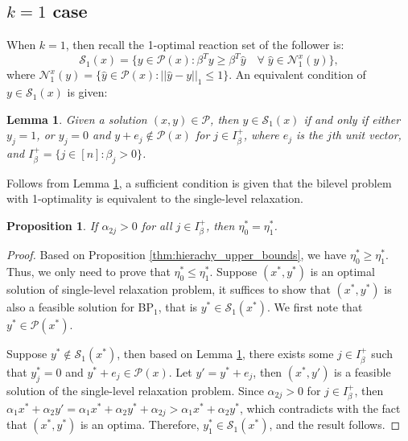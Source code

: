 \documentclass[11pt]{article}
\newtheorem{lemma}{Lemma}
\newtheorem{proposition}{Proposition}
\newcommand{\N}{\mathcal{N}}
\newcommand{\Pp}{\mathcal{P}}
\newcommand{\Ss}{\mathcal{S}}
\begin{document}
\subsection{$k = 1$ case}

When $k=1$, then recall the 1-optimal reaction set of the follower is:
\[\Ss_1(x) = \{y \in \Pp(x): \beta^T y \geq \beta^T \hat{y} \quad \forall\; \hat{y} \in \N^x_1(y)\},\]
where $\N^x_1(y) = \{\hat{y} \in \Pp(x): ||\hat{y} - y||_1 \leq 1 \}$. An equivalent condition of $y\in \Ss_1(x)$ is given:
\begin{lemma}\label{thm:opt_condition_k1}
	Given a solution $(x, y) \in \Pp$, then $y\in \Ss_1(x)$ if and only if either $y_j = 1$, or $y_j = 0$ and $y + e_j \notin \Pp(x)$ for $j\in I_\beta^+$,  where $e_j$ is the $j$th unit vector, and $I_\beta^+ = \{j \in [n]: \beta_j >0\}$.
\end{lemma}

Follows from Lemma \ref{thm:opt_condition_k1}, a sufficient condition is given that the bilevel problem with 1-optimality is equivalent to the single-level relaxation.

\begin{proposition} \label{thm:hpp=1optimal}
	If $\alpha_{2j} > 0$ for all $j\in I_\beta^+$, then $\eta_0^* = \eta_1^*$.
\end{proposition}
\begin{proof}
	Based on Proposition \ref{thm:hierachy_upper_bounds}, we have $\eta^*_0 \geq \eta^*_1$. Thus, we only need to prove that $\eta^*_0 \leq \eta^*_1$. Suppose $(x^*, y^*)$ is an optimal solution of single-level relaxation problem, it suffices to show that $(x^*, y^*)$ is also a feasible solution for BP$_1$, that is $y^* \in \Ss_1(x^*)$. We first note that $y^* \in \Pp(x^*)$.
	
	Suppose $y^* \notin \Ss_1(x^*)$, then based on Lemma \ref{thm:opt_condition_k1}, there exists some $j \in I^+_\beta$ such that $y^*_j = 0$ and $y^*+e_j \in \Pp(x)$. Let $y' = y^* + e_j$, then $(x^*, y')$ is a feasible solution of the single-level relaxation problem. Since $\alpha_{2j} > 0$ for $j \in I_\beta^+$, then $\alpha_1x^* + \alpha_2y' = \alpha_1x^* + \alpha_2y^* + \alpha_{2j} > \alpha_1x^* + \alpha_2y^*$, which contradicts with the fact that $(x^*, y^*)$ is an optima. Therefore, $y_1^* \in \Ss_1(x^*)$, and the result follows.
	
	
\end{proof}
\end{document}
